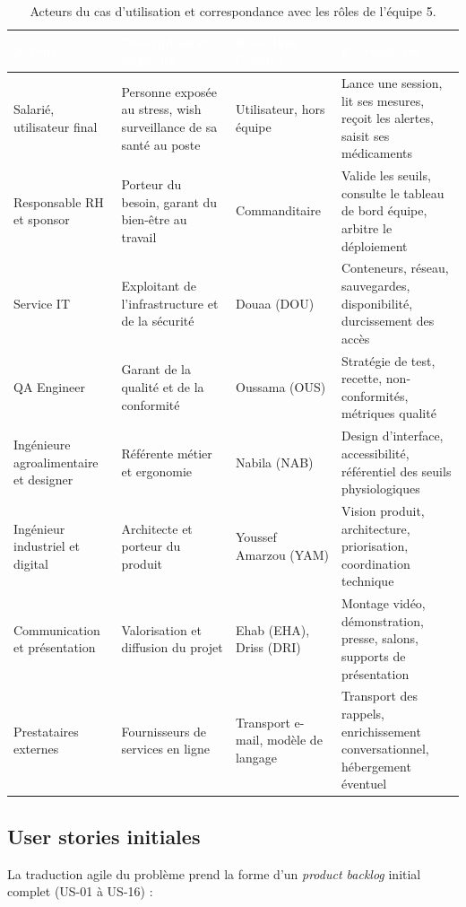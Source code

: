 \documentclass[11pt,a4paper]{article}
\begin{document}
\begin{table}[H]
\centering\footnotesize
\begin{tabularx}{\linewidth}{>{\raggedright\arraybackslash}p{3.5cm} >{\raggedright\arraybackslash}p{4.6cm} >{\raggedright\arraybackslash}p{3.5cm} >{\raggedright\arraybackslash}X}
\toprule
\rowcolor{cwblue} \textcolor{white}{\bf Acteur} & \textcolor{white}{\bf Description et objectifs} &
\textcolor{white}{\bf Rôle dans l'équipe} & \textcolor{white}{\bf Prérogatives} \\
\midrule
Salarié, utilisateur final & Personne exposée au stress, wish surveillance de sa santé au poste &
Utilisateur, hors équipe & Lance une session, lit ses mesures, reçoit les alertes, saisit ses médicaments \\
Responsable RH et sponsor & Porteur du besoin, garant du bien-être au travail & Commanditaire &
Valide les seuils, consulte le tableau de bord équipe, arbitre le déploiement \\
Service IT & Exploitant de l'infrastructure et de la sécurité & Douaa (DOU) &
Conteneurs, réseau, sauvegardes, disponibilité, durcissement des accès \\
QA Engineer & Garant de la qualité et de la conformité & Oussama (OUS) &
Stratégie de test, recette, non-conformités, métriques qualité \\
Ingénieure agroalimentaire et designer & Référente métier et ergonomie & Nabila (NAB) &
Design d'interface, accessibilité, référentiel des seuils physiologiques \\
Ingénieur industriel et digital & Architecte et porteur du produit & Youssef Amarzou (YAM) &
Vision produit, architecture, priorisation, coordination technique \\
Communication et présentation & Valorisation et diffusion du projet & Ehab (EHA), Driss (DRI) &
Montage vidéo, démonstration, presse, salons, supports de présentation \\
Prestataires externes & Fournisseurs de services en ligne & Transport e-mail, modèle de langage &
Transport des rappels, enrichissement conversationnel, hébergement éventuel \\
\bottomrule
\end{tabularx}
\caption{Acteurs du cas d'utilisation et correspondance avec les rôles de l'équipe 5.}
\label{tab:acteurs}
\end{table}

\subsection{User stories initiales}
\label{sec:us}
La traduction agile du problème prend la forme d'un \textit{product backlog} initial
complet (US-01 à US-16) :
\end{document}
